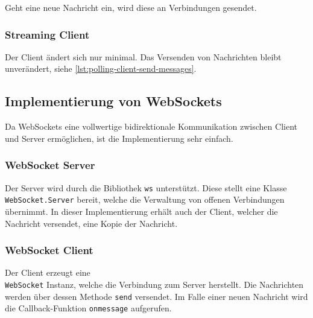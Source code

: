 \documentclass[sigplan, screen]{acmart}
\begin{document}
Geht eine neue Nachricht ein, wird diese an Verbindungen gesendet.



\subsubsection{Streaming Client}

Der Client ändert sich nur minimal.
Das Versenden von Nachrichten bleibt unverändert, siehe \autoref{lst:polling-client-send-messages}.



\subsection{Implementierung von WebSockets}

Da WebSockets eine vollwertige bidirektionale Kommunikation zwischen Client und Server ermöglichen, ist die Implementierung sehr einfach.

\subsubsection{WebSocket Server}

Der Server wird durch die Bibliothek \texttt{ws} unterstützt.
Diese stellt eine Klasse \texttt{WebSocket.Server} bereit, welche die Verwaltung von offenen Verbindungen übernimmt.
In dieser Implementierung erhält auch der Client, welcher die Nachricht versendet, eine Kopie der Nachricht.



\subsubsection{WebSocket Client}

Der Client erzeugt eine \\\texttt{WebSocket} Instanz, welche die Verbindung zum Server herstellt.
Die Nachrichten werden über dessen Methode \texttt{send} versendet.
Im Falle einer neuen Nachricht wird die Callback-Funktion \texttt{onmessage} aufgerufen.
\end{document}

